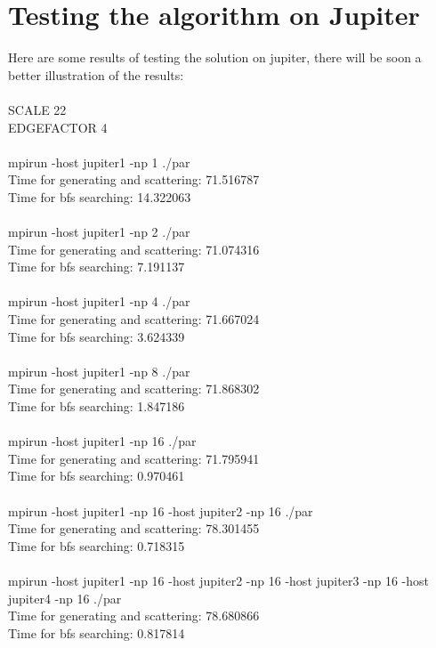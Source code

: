 \documentclass[12pt,a4paper]{article}
\begin{document}
\section{Testing the algorithm on Jupiter}
\label{sec:testing}

Here are some results of testing the solution on jupiter, there will be soon a better illustration of the results: \\
\\
SCALE 22\\
EDGEFACTOR 4\\
\\
mpirun -host jupiter1 -np 1 ./par\\
Time for generating and scattering: 71.516787\\
Time for bfs searching: 14.322063\\
\\
mpirun -host jupiter1 -np 2 ./par\\
Time for generating and scattering: 71.074316\\
Time for bfs searching: 7.191137\\
\\
mpirun -host jupiter1 -np 4 ./par\\
Time for generating and scattering: 71.667024\\
Time for bfs searching: 3.624339\\
\\
mpirun -host jupiter1 -np 8 ./par\\
Time for generating and scattering: 71.868302\\
Time for bfs searching: 1.847186\\
\\
mpirun -host jupiter1 -np 16 ./par\\
Time for generating and scattering: 71.795941\\
Time for bfs searching: 0.970461\\
\\
mpirun -host jupiter1 -np 16 -host jupiter2 -np 16 ./par\\
Time for generating and scattering: 78.301455\\
Time for bfs searching: 0.718315\\
\\
mpirun -host jupiter1 -np 16 -host jupiter2 -np 16 -host jupiter3 -np 16 -host jupiter4 -np 16 ./par\\
Time for generating and scattering: 78.680866\\
Time for bfs searching: 0.817814\\
\end{document}
